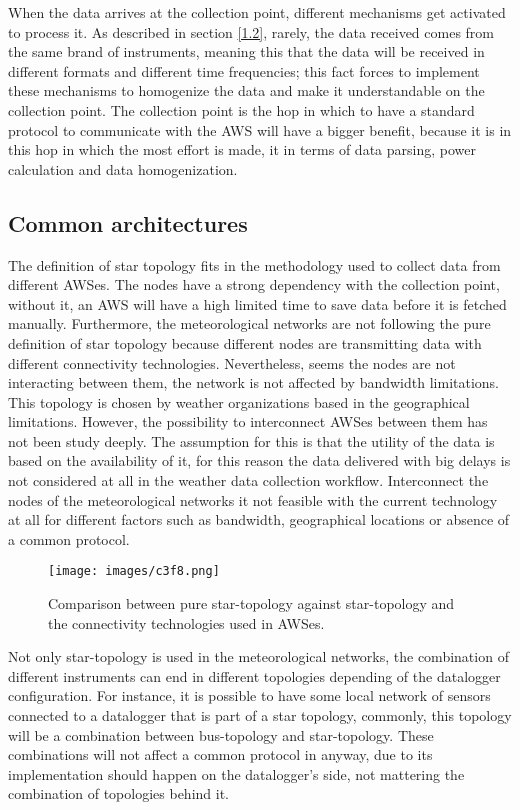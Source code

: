 {When the data arrives at the collection point, different mechanisms get activated to process it. As described in section \ref{1.2}, rarely, the data received comes from the same brand of instruments, meaning this that the data will be received in different formats and different time frequencies; this fact forces to implement these mechanisms to homogenize the data and make it understandable on the collection point. The collection point is the hop in which to have a standard protocol to communicate with the \gls{AWS} will have a bigger benefit, because it is in this hop in which the most effort is made, it in terms of data parsing, power calculation and data homogenization.




\subsection{Common architectures}

The definition of star topology fits in the methodology used to collect data from different \gls{AWS}es. The nodes have a strong dependency with the collection point, without it, an \gls{AWS} will have a high limited time to save data before it is fetched manually. Furthermore, the meteorological networks are not following the pure definition of star topology because different nodes are transmitting data with different connectivity technologies. Nevertheless, seems the nodes are not interacting between them, the network is not affected by bandwidth limitations. This topology is chosen by weather organizations based in the geographical limitations. However, the possibility to interconnect \gls{AWS}es between them has not been study deeply. The assumption for this is that the utility of the data is based on the availability of it, for this reason the data delivered with big delays is not considered at all in the weather data collection workflow. Interconnect the nodes of the meteorological networks it not feasible with the current technology at all for different factors such as bandwidth, geographical locations or absence of a common protocol.

\begin{figure}[h!]
\centerline{\texttt{[image: images/c3f8.png]}}
\caption{Comparison between pure star-topology against star-topology and the connectivity technologies used in \protect \gls{AWS}es.}
\end{figure}

Not only star-topology is used in the meteorological networks, the combination of different instruments can end in different topologies depending of the datalogger configuration. For instance, it is possible to have some local network of sensors connected to a datalogger that is part of a star topology, commonly, this topology will be a combination between bus-topology and star-topology. These combinations will not affect a common protocol in anyway, due to its implementation should happen on the datalogger's side, not mattering the combination of topologies behind it.

}
